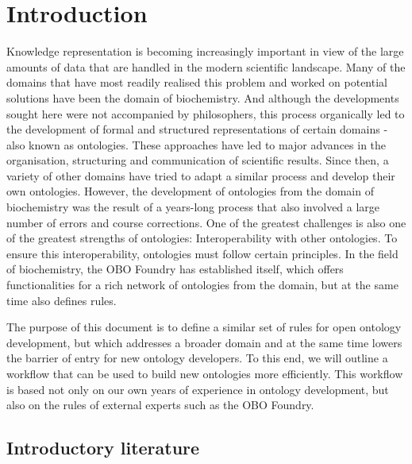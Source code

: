 \section{Introduction}


Knowledge representation is becoming increasingly important in view of the large amounts of data that are handled in the modern scientific landscape. Many of the domains that have most readily realised this problem and worked on potential solutions have been the domain of biochemistry. And although the developments sought here were not accompanied by philosophers, this process organically led to the development of formal and structured representations of certain domains - also known as ontologies.
These approaches have led to major advances in the organisation, structuring and communication of scientific results. Since then, a variety of other domains have tried to adapt a similar process and develop their own ontologies. However, the development of ontologies from the domain of biochemistry was the result of a years-long process that also involved a large number of errors and course corrections. One of the greatest challenges is also one of the greatest strengths of ontologies: Interoperability with other ontologies. To ensure this interoperability, ontologies must follow certain principles. In the field of biochemistry, the OBO Foundry has established itself, which offers functionalities for a rich network of ontologies from the domain, but at the same time also defines rules.

The purpose of this document is to define a similar set of rules for open ontology development, but which addresses a broader domain and at the same time lowers the barrier of entry for new ontology developers. To this end, we will outline a workflow that can be used to build new ontologies more efficiently. This workflow is based not only on our own years of experience in ontology development, but also on the rules of external experts such as the OBO Foundry.

\subsection{Introductory literature}


